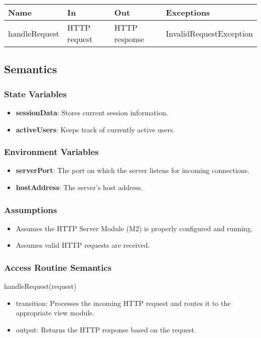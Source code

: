 \documentclass[12pt, titlepage]{article}
\begin{document}
\begin{center}
\begin{tabular}{p{2.5cm} p{3.5cm} p{3.5cm} p{3cm}}
\hline
\textbf{Name} & \textbf{In} & \textbf{Out} & \textbf{Exceptions} \\
\hline
handleRequest & HTTP request & HTTP response & InvalidRequestException \\
\hline
\end{tabular}
\end{center}
\subsection{Semantics}
\subsubsection{State Variables}
\begin{itemize}
  \item \textbf{sessionData}: Stores current session information.
  \item \textbf{activeUsers}: Keeps track of currently active users.
\end{itemize}
\subsubsection{Environment Variables}
\begin{itemize}
  \item \textbf{serverPort}: The port on which the server listens for incoming connections.
  \item \textbf{hostAddress}: The server's host address.
\end{itemize}
\subsubsection{Assumptions}
\begin{itemize}
  \item Assumes the HTTP Server Module (M2) is properly configured and running.
  \item Assumes valid HTTP requests are received.
\end{itemize}
\subsubsection{Access Routine Semantics}

handleRequest(request)
\begin{itemize}
\item transition:  Processes the incoming HTTP request and routes it to the appropriate view module.
\item output: Returns the HTTP response based on the request.
\end{itemize}
\end{document}
